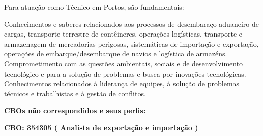 \documentclass[
]{article}
\begin{document}
Para atuação como Técnico em Portos, são fundamentais:

Conhecimentos e saberes relacionados aos processos de desembaraço
aduaneiro de cargas, transporte terrestre de contêineres, operações
logísticas, transporte e armazenagem de mercadorias perigosas,
sistemáticas de importação e exportação, operações de
embarque/desembarque de navios e logística de armazéns. Comprometimento
com as questões ambientais, sociais e de desenvolvimento tecnológico e
para a solução de problemas e busca por inovações tecnológicas.
Conhecimentos relacionados à liderança de equipes, à solução de
problemas técnicos e trabalhistas e à gestão de conflitos.

\textbf{CBOs não correspondidos e seus perfis:}

\textbf{CBO: 354305  ( Analista de exportação e importação )}
\end{document}
